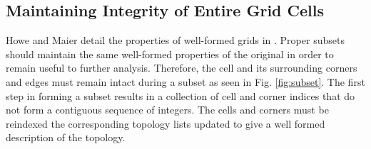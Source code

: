 \subsection{Maintaining Integrity of Entire Grid Cells}

Howe and Maier detail the properties of well-formed grids in \cite{UGRID}.
Proper subsets should maintain the same well-formed properties of the original
in order to remain useful to further analysis.  Therefore, the cell and its
surrounding corners and edges must remain intact during a subset as seen in
Fig. \ref{fig:subset}. The first step in forming a subset results in a
collection of cell and corner indices that do not form a contiguous sequence
of integers. The cells and corners must be reindexed the corresponding topology
lists updated to give a well formed description of the topology.
